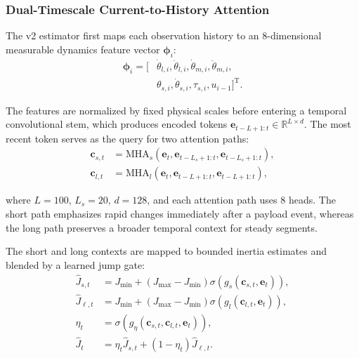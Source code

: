 \documentclass[lettersize,journal]{IEEEtran}
\begin{document}
\subsubsection{Dual-Timescale Current-to-History Attention}

The v2 estimator first maps each observation history to an 8-dimensional measurable dynamics feature vector $\bm{\phi}_i$:
\begin{equation}
\begin{aligned}
\bm{\phi}_i = [&\dot{\theta}_{l,i}, \ddot{\theta}_{l,i}, \dot{\theta}_{m,i}, \ddot{\theta}_{m,i}, \\
&\theta_{s,i}, \dot{\theta}_{s,i}, \tau_{s,i}, u_{i-1}]^\mathrm{T}.
\end{aligned}
\label{eq:fast_features}
\end{equation}

\noindent The features are normalized by fixed physical scales before entering a temporal convolutional stem, which produces encoded tokens $\bm{e}_{t-L+1:t} \in \mathbb{R}^{L \times d}$. The most recent token serves as the query for two attention paths:
\begin{equation}
\begin{aligned}
\bm{c}_{s,t} &= \mathrm{MHA}_s(\bm{e}_t, \bm{e}_{t-L_s+1:t}, \bm{e}_{t-L_s+1:t}), \\
\bm{c}_{l,t} &= \mathrm{MHA}_l(\bm{e}_t, \bm{e}_{t-L+1:t}, \bm{e}_{t-L+1:t}),
\end{aligned}
\label{eq:dual_attention}
\end{equation}

\noindent where $L=100$, $L_s=20$, $d=128$, and each attention path uses 8 heads. The short path emphasizes rapid changes immediately after a payload event, whereas the long path preserves a broader temporal context for steady segments.

The short and long contexts are mapped to bounded inertia estimates and blended by a learned jump gate:
\begin{equation}
\begin{aligned}
\hat{J}_{s,t} &= J_{\min} + (J_{\max}-J_{\min})\sigma(g_s(\bm{c}_{s,t}, \bm{e}_t)), \\
\hat{J}_{\ell,t} &= J_{\min} + (J_{\max}-J_{\min})\sigma(g_l(\bm{c}_{l,t}, \bm{e}_t)), \\
\eta_t &= \sigma(g_\eta(\bm{c}_{s,t}, \bm{c}_{l,t}, \bm{e}_t)), \\
\hat{J}_t &= \eta_t \hat{J}_{s,t} + (1-\eta_t)\hat{J}_{\ell,t}.
\end{aligned}
\label{eq:inertia_estimate}
\end{equation}
\end{document}
